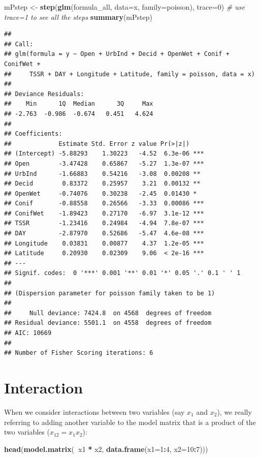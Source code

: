 \documentclass[12pt,]{book}
\newenvironment{Shaded}{\begin{snugshade}}{\end{snugshade}}
\newcommand{\CommentTok}[1]{\textcolor[rgb]{0.56,0.35,0.01}{\textit{#1}}}
\newcommand{\DataTypeTok}[1]{\textcolor[rgb]{0.13,0.29,0.53}{#1}}
\newcommand{\DecValTok}[1]{\textcolor[rgb]{0.00,0.00,0.81}{#1}}
\newcommand{\KeywordTok}[1]{\textcolor[rgb]{0.13,0.29,0.53}{\textbf{#1}}}
\newcommand{\NormalTok}[1]{#1}
\newcommand{\OperatorTok}[1]{\textcolor[rgb]{0.81,0.36,0.00}{\textbf{#1}}}
\newcommand{\StringTok}[1]{\textcolor[rgb]{0.31,0.60,0.02}{#1}}
\begin{document}
\begin{Shaded}
\begin{Highlighting}[]
\NormalTok{mPstep <-}\StringTok{ }\KeywordTok{step}\NormalTok{(}\KeywordTok{glm}\NormalTok{(formula_all, }\DataTypeTok{data=}\NormalTok{x, }\DataTypeTok{family=}\NormalTok{poisson), }
  \DataTypeTok{trace=}\DecValTok{0}\NormalTok{) }\CommentTok{# use trace=1 to see all the steps}
\KeywordTok{summary}\NormalTok{(mPstep)}
\end{Highlighting}
\end{Shaded}

\begin{verbatim}
## 
## Call:
## glm(formula = y ~ Open + UrbInd + Decid + OpenWet + Conif + ConifWet + 
##     TSSR + DAY + Longitude + Latitude, family = poisson, data = x)
## 
## Deviance Residuals: 
##    Min      1Q  Median      3Q     Max  
## -2.763  -0.986  -0.674   0.451   4.624  
## 
## Coefficients:
##             Estimate Std. Error z value Pr(>|z|)    
## (Intercept) -5.88293    1.30223   -4.52  6.3e-06 ***
## Open        -3.47428    0.65867   -5.27  1.3e-07 ***
## UrbInd      -1.66883    0.54216   -3.08  0.00208 ** 
## Decid        0.83372    0.25957    3.21  0.00132 ** 
## OpenWet     -0.74076    0.30238   -2.45  0.01430 *  
## Conif       -0.88558    0.26566   -3.33  0.00086 ***
## ConifWet    -1.89423    0.27170   -6.97  3.1e-12 ***
## TSSR        -1.23416    0.24984   -4.94  7.8e-07 ***
## DAY         -2.87970    0.52686   -5.47  4.6e-08 ***
## Longitude    0.03831    0.00877    4.37  1.2e-05 ***
## Latitude     0.20930    0.02309    9.06  < 2e-16 ***
## ---
## Signif. codes:  0 '***' 0.001 '**' 0.01 '*' 0.05 '.' 0.1 ' ' 1
## 
## (Dispersion parameter for poisson family taken to be 1)
## 
##     Null deviance: 7424.8  on 4568  degrees of freedom
## Residual deviance: 5501.1  on 4558  degrees of freedom
## AIC: 10669
## 
## Number of Fisher Scoring iterations: 6
\end{verbatim}

\hypertarget{interaction}{%
\section{Interaction}\label{interaction}}

When we consider interactions between two variables (say \(x_1\) and \(x_2\)),
we really referring to adding another variable to the model matrix
that is a product of the two variables (\(x_{12}=x_1 x_2\)):

\begin{Shaded}
\begin{Highlighting}[]
\KeywordTok{head}\NormalTok{(}\KeywordTok{model.matrix}\NormalTok{(}\OperatorTok{~}\NormalTok{x1 }\OperatorTok{*}\StringTok{ }\NormalTok{x2, }\KeywordTok{data.frame}\NormalTok{(}\DataTypeTok{x1=}\DecValTok{1}\OperatorTok{:}\DecValTok{4}\NormalTok{, }\DataTypeTok{x2=}\DecValTok{10}\OperatorTok{:}\DecValTok{7}\NormalTok{)))}
\end{Highlighting}
\end{Shaded}
\end{document}
